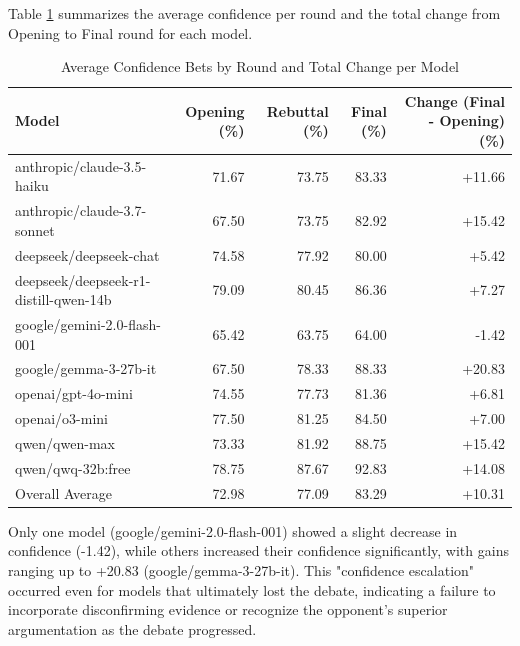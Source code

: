 \documentclass{article}
\begin{document}
Table \ref{tab:confidence_escalation} summarizes the average confidence per round and the total change from Opening to Final round for each model.

\begin{table}[h]
  \caption{Average Confidence Bets by Round and Total Change per Model}
  \label{tab:confidence_escalation}
  \centering
  \begin{tabular}{lrrrr}
    \toprule
    Model                              & Opening (\%) & Rebuttal (\%) & Final (\%) & Change (Final - Opening) (\%) \\
    \midrule
    anthropic/claude-3.5-haiku         & 71.67   & 73.75    & 83.33   & +11.66 \\
    anthropic/claude-3.7-sonnet        & 67.50   & 73.75    & 82.92   & +15.42 \\
    deepseek/deepseek-chat             & 74.58   & 77.92    & 80.00   & +5.42  \\
    deepseek/deepseek-r1-distill-qwen-14b & 79.09   & 80.45    & 86.36   & +7.27  \\
    google/gemini-2.0-flash-001        & 65.42   & 63.75    & 64.00   & -1.42  \\
    google/gemma-3-27b-it              & 67.50   & 78.33    & 88.33   & +20.83 \\
    openai/gpt-4o-mini                 & 74.55   & 77.73    & 81.36   & +6.81  \\
    openai/o3-mini                     & 77.50   & 81.25    & 84.50   & +7.00  \\
    qwen/qwen-max                      & 73.33   & 81.92    & 88.75   & +15.42 \\
    qwen/qwq-32b:free                  & 78.75   & 87.67    & 92.83   & +14.08 \\
    \midrule
    Overall Average                    & 72.98   & 77.09    & 83.29   & +10.31 \\ %
    \bottomrule
  \end{tabular}
\end{table}

Only one model (google/gemini-2.0-flash-001) showed a slight decrease in confidence (-1.42), while others increased their confidence significantly, with gains ranging up to +20.83 (google/gemma-3-27b-it). This "confidence escalation" occurred even for models that ultimately lost the debate, indicating a failure to incorporate disconfirming evidence or recognize the opponent's superior argumentation as the debate progressed.
\end{document}
